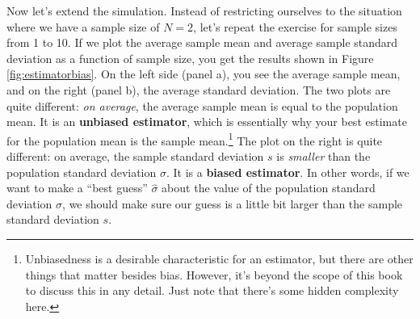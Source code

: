 \documentclass[
]{book}
\theoremstyle{definition}
\theoremstyle{definition}
\theoremstyle{definition}
\theoremstyle{definition}
\theoremstyle{remark}
\begin{document}
Now let's extend the simulation. Instead of restricting ourselves to the situation where we have a sample size of \(N=2\), let's repeat the exercise for sample sizes from 1 to 10. If we plot the average sample mean and average sample standard deviation as a function of sample size, you get the results shown in Figure \ref{fig:estimatorbias}. On the left side (panel a), you see the average sample mean, and on the right (panel b), the average standard deviation. The two plots are quite different: \emph{on average}, the average sample mean is equal to the population mean. It is an \textbf{unbiased estimator}, which is essentially why your best estimate for the population mean is the sample mean.\footnote{Unbiasedness is a desirable characteristic for an estimator, but there are other things that matter besides bias. However, it's beyond the scope of this book to discuss this in any detail. Just note that there's some hidden complexity here.} The plot on the right is quite different: on average, the sample standard deviation \(s\) is \emph{smaller} than the population standard deviation \(\sigma\). It is a \textbf{biased estimator}. In other words, if we want to make a ``best guess'' \(\hat\sigma\) about the value of the population standard deviation \(\sigma\), we should make sure our guess is a little bit larger than the sample standard deviation \(s\).
\end{document}

